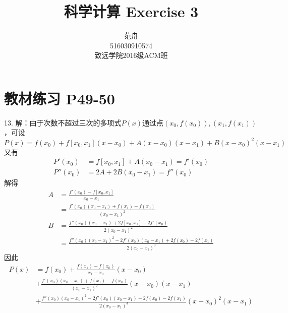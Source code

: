 \documentclass[12pt, a4paper]{article}
\title{科学计算 Exercise 3}
\author{范舟\\516030910574\\致远学院2016级ACM班}
\date{}
\theoremstyle{margin}
\begin{document}
\maketitle

\section{教材练习 P49-50}

13. 解：由于次数不超过三次的多项式$P\left(x\right)$通过点$\left(x_0, f\left(x_0\right)\right),\left(x_1, f\left(x_1\right)\right)$，可设
\[P\left(x\right)=f\left(x_0\right)+f\left[x_0,x_1\right]\left(x-x_0\right)+A\left(x-x_0\right)\left(x-x_1\right)+B\left(x-x_0\right)^2\left(x-x_1\right)\]
又有
\[\begin{split}
	P'\left(x_0\right)&=f\left[x_0,x_1\right]+A\left(x_0-x_1\right)=f'\left(x_0\right) \\
	P''\left(x_0\right)&=2A+2B\left(x_0-x_1\right)=f''\left(x_0\right)
\end{split}\]
解得
\[\begin{split}
	A&=\frac{f'\left(x_0\right)-f\left[x_0,x_1\right]}{x_0-x_1} \\
	&=\frac{f'\left(x_0\right)\left(x_0-x_1\right)+f\left(x_1\right)-f\left(x_0\right)}{\left(x_0-x_1\right)^2} \\
	B&=\frac{f''\left(x_0\right)\left(x_0-x_1\right)+2f\left[x_0,x_1\right]-2f'\left(x_0\right)}{2\left(x_0-x_1\right)^2} \\
	&=\frac{f''\left(x_0\right)\left(x_0-x_1\right)^2-2f'\left(x_0\right)\left(x_0-x_1\right)+2f\left(x_0\right)-2f\left(x_1\right)}{2\left(x_0-x_1\right)^3}
\end{split}\]
因此
\[\begin{split}
	P\left(x\right)&=f\left(x_0\right)+\frac{f\left(x_1\right)-f\left(x_0\right)}{x_1-x_0}\left(x-x_0\right) \\
	&+\frac{f'\left(x_0\right)\left(x_0-x_1\right)+f\left(x_1\right)-f\left(x_0\right)}{\left(x_0-x_1\right)^2}\left(x-x_0\right)\left(x-x_1\right) \\
	&+\frac{f''\left(x_0\right)\left(x_0-x_1\right)^2-2f'\left(x_0\right)\left(x_0-x_1\right)+2f\left(x_0\right)-2f\left(x_1\right)}{2\left(x_0-x_1\right)^3}\left(x-x_0\right)^2\left(x-x_1\right)
\end{split}\]
\newline
\end{document}
